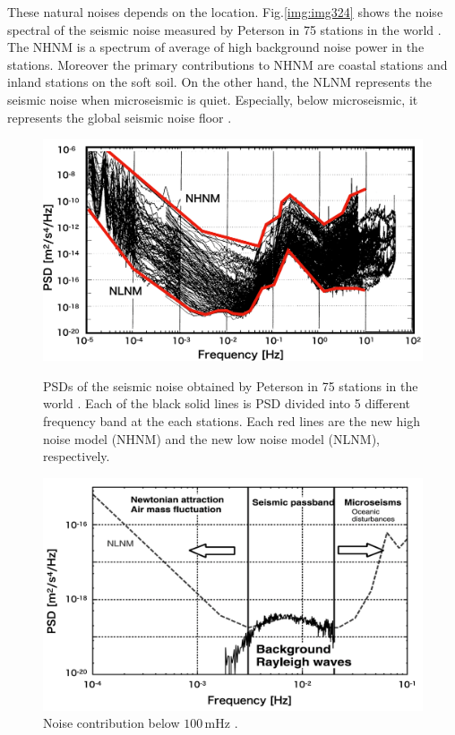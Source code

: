 These natural noises depends on the location. Fig.\ref{img:img324} shows the noise spectral of the seismic noise measured by Peterson in 75 stations in the world \cite{peterson1993observations}. The NHNM is a spectrum of average of high background noise power in the stations. Moreover the primary contributions to NHNM are coastal stations and inland stations on the soft soil. On the other hand, the NLNM represents the seismic noise when microseismic is quiet. Especially, below microseismic, it represents the global seismic noise floor \cite{nishida2002origin}. 

\begin{figure}[p]
  \begin{center}   
    \includegraphics[width=12.5cm]{./img_chap3/img324.png}
    \caption{PSDs of the seismic noise obtained by Peterson in 75 stations in the world \cite{peterson1993observations}. Each of the black solid lines is PSD divided into 5 different frequency band at the each stations. Each red lines are the new high noise model (NHNM) and the new low noise model (NLNM), respectively.}\label{img:img324}
  \end{center}
  \begin{center}   
    \includegraphics[width=13cm]{./img_chap3/img325.png}
    \caption{Noise contribution below $100\,\mathrm{mHz}$ \cite{nishida2002origin}. }\label{img:img325}
  \end{center} 
\end{figure}


